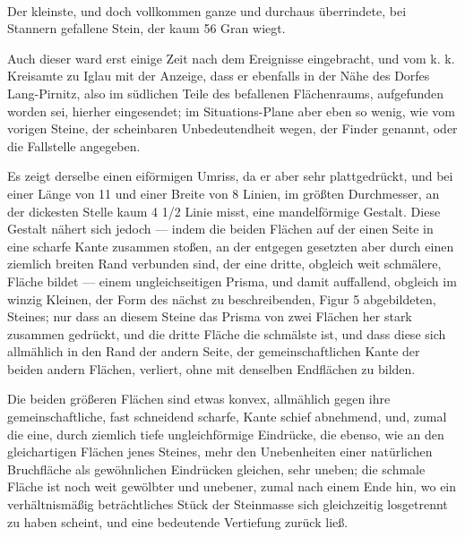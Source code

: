 \documentclass[a4paper, 11pt, oneside, german]{article}
\begin{document}
\paragraph{}
Der kleinste, und doch vollkommen ganze und durchaus überrindete, bei Stannern gefallene Stein, der kaum 56 Gran wiegt.

Auch dieser ward erst einige Zeit nach dem Ereignisse eingebracht, und vom k. k. Kreisamte zu Iglau mit der Anzeige, dass er ebenfalls in der Nähe des Dorfes Lang-Pirnitz, also im südlichen Teile des befallenen Flächenraums, aufgefunden worden sei, hierher eingesendet; im Situations-Plane aber eben so wenig, wie vom vorigen Steine, der scheinbaren Unbedeutendheit wegen, der Finder genannt, oder die Fallstelle angegeben.

Es zeigt derselbe einen eiförmigen Umriss, da er aber sehr plattgedrückt, und bei einer Länge von 11 und einer Breite von 8 Linien, im größten Durchmesser, an der dickesten Stelle kaum 4 1/2 Linie misst, eine mandelförmige Gestalt. Diese Gestalt nähert sich jedoch --- indem die beiden Flächen auf der einen Seite in eine scharfe Kante zusammen stoßen, an der entgegen gesetzten aber durch einen ziemlich breiten Rand verbunden sind, der eine dritte, obgleich weit schmälere, Fläche bildet --- einem ungleichseitigen Prisma, und damit auffallend, obgleich im winzig Kleinen, der Form des nächst zu beschreibenden, Figur 5 abgebildeten, Steines; nur dass an diesem Steine das Prisma von zwei Flächen her stark zusammen gedrückt, und die dritte Fläche die schmälste ist, und dass diese sich allmählich in den Rand der andern Seite, der gemeinschaftlichen Kante der beiden andern Flächen, verliert, ohne mit denselben Endflächen zu bilden.

Die beiden größeren Flächen sind etwas konvex, allmählich gegen ihre gemeinschaftliche, fast schneidend scharfe, Kante schief abnehmend, und, zumal die eine, durch ziemlich tiefe ungleichförmige Eindrücke, die ebenso, wie an den gleichartigen Flächen jenes Steines, mehr den Unebenheiten einer natürlichen Bruchfläche als gewöhnlichen Eindrücken gleichen, sehr uneben; die schmale Fläche ist noch weit gewölbter und unebener, zumal nach einem Ende hin, wo ein verhältnismäßig beträchtliches Stück der Steinmasse sich gleichzeitig losgetrennt zu haben scheint, und eine bedeutende Vertiefung zurück ließ.
\end{document}
